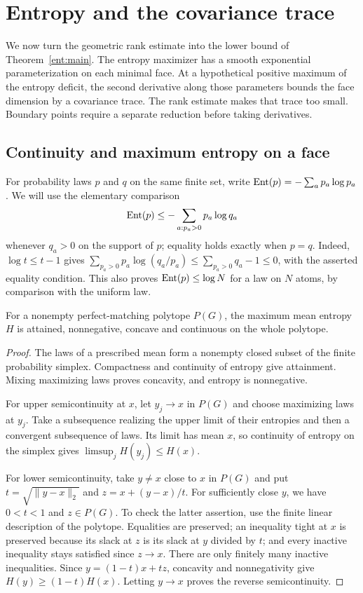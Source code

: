 \section{Entropy and the covariance trace}
\label{sec:entropy}

We now turn the geometric rank estimate into the lower bound of
Theorem~\ref{ent:main}. The entropy maximizer has a smooth exponential
parameterization on each minimal face. At a hypothetical positive maximum
of the entropy deficit, the second derivative along those parameters
bounds the face dimension by a covariance trace. The rank estimate makes
that trace too small. Boundary points require a separate reduction before
taking derivatives.

\subsection{Continuity and maximum entropy on a face}

For probability laws $p$ and $q$ on the same finite set, write
$\operatorname{Ent}(p)=-\sum_a p_a\log p_a$. We will use the elementary comparison
\begin{equation}\label{ent:comparison}
 \operatorname{Ent}(p)\le-\sum_{a:p_a>0}p_a\log q_a
\end{equation}
whenever $q_a>0$ on the support of $p$; equality holds exactly when $p=q$.
Indeed, $\log t\le t-1$ gives
$\sum_{p_a>0}p_a\log(q_a/p_a)\le\sum_{p_a>0}q_a-1\le0$,
with the asserted equality condition. This also proves
$\operatorname{Ent}(p)\le\log N$ for a law on $N$ atoms, by comparison with the uniform law.

\begin{lemma}\label{ent:continuity}
For a nonempty perfect-matching polytope $P(G)$, the maximum mean entropy
$H$ is attained, nonnegative, concave and continuous on the whole polytope.
\end{lemma}
\begin{proof}
The laws of a prescribed mean form a nonempty closed subset of the finite
probability simplex. Compactness and continuity of entropy give attainment.
Mixing maximizing laws proves concavity, and entropy is nonnegative.

For upper semicontinuity at $x$, let $y_j\to x$ in $P(G)$ and choose
maximizing laws at $y_j$. Take a subsequence realizing the upper limit of
their entropies and then a convergent subsequence of laws. Its limit has
mean $x$, so continuity of entropy on the simplex gives
$\limsup_j H(y_j)\le H(x)$.

For lower semicontinuity, take $y\ne x$ close to $x$ in $P(G)$ and put
$t=\sqrt{\|y-x\|_2}$ and $z=x+(y-x)/t$. For sufficiently close $y$,
we have $0<t<1$ and $z\in P(G)$. To check the latter assertion, use
the finite linear description of the polytope. Equalities are preserved;
an inequality tight at $x$ is preserved because its slack at $z$ is its
slack at $y$ divided by $t$; and every inactive inequality stays satisfied
since $z\to x$. There are only finitely many inactive inequalities.
Since $y=(1-t)x+tz$, concavity and nonnegativity give
$H(y)\ge(1-t)H(x)$. Letting $y\to x$ proves the reverse semicontinuity.
\end{proof}

